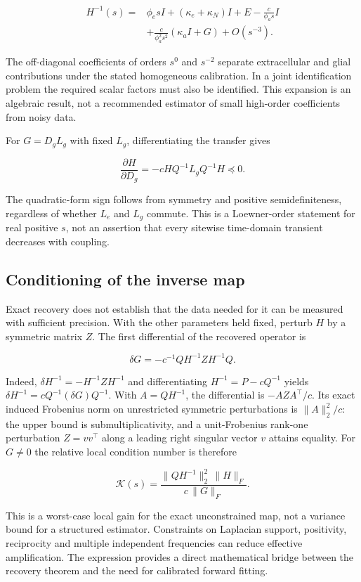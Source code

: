 \documentclass[
  11pt,
]{article}
\begin{document}
\[\begin{aligned}
H^{-1}(s)={}&\phi_e s I+(\kappa_e+\kappa_N)I+E-\frac{c}{\phi_a s}I\\
&+\frac{c}{\phi_a^2s^2}(\kappa_a I+G)+O(s^{-3}).
\end{aligned}\]

The off-diagonal coefficients of orders \(s^0\) and \(s^{-2}\) separate
extracellular and glial contributions under the stated homogeneous
calibration. In a joint identification problem the required scalar
factors must also be identified. This expansion is an algebraic result,
not a recommended estimator of small high-order coefficients from noisy
data.

For \(G=D_gL_g\) with fixed \(L_g\), differentiating the transfer gives

\[\frac{\partial H}{\partial D_g}=-cH Q^{-1}L_gQ^{-1}H\preceq0.\]

The quadratic-form sign follows from symmetry and positive
semidefiniteness, regardless of whether \(L_e\) and \(L_g\) commute.
This is a Loewner-order statement for real positive \(s\), not an
assertion that every sitewise time-domain transient decreases with
coupling.

\subsection{Conditioning of the inverse
map}\label{conditioning-of-the-inverse-map}

Exact recovery does not establish that the data needed for it can be
measured with sufficient precision. With the other parameters held
fixed, perturb \(H\) by a symmetric matrix \(Z\). The first differential
of the recovered operator is

\[\delta G=-c^{-1}QH^{-1}ZH^{-1}Q.\]

Indeed, \(\delta H^{-1}=-H^{-1}ZH^{-1}\) and differentiating
\(H^{-1}=P-cQ^{-1}\) yields \(\delta H^{-1}=cQ^{-1}(\delta G)Q^{-1}\).
With \(A=QH^{-1}\), the differential is \(-AZA^\top/c\). Its exact
induced Frobenius norm on unrestricted symmetric perturbations is
\(\|A\|_2^2/c\): the upper bound is submultiplicativity, and a
unit-Frobenius rank-one perturbation \(Z=vv^\top\) along a leading right
singular vector \(v\) attains equality. For \(G\ne0\) the relative local
condition number is therefore

\[\mathcal K(s)=\frac{\|QH^{-1}\|_2^2\,\|H\|_F}{c\,\|G\|_F}.\]

This is a worst-case local gain for the exact unconstrained map, not a
variance bound for a structured estimator. Constraints on Laplacian
support, positivity, reciprocity and multiple independent frequencies
can reduce effective amplification. The expression provides a direct
mathematical bridge between the recovery theorem and the need for
calibrated forward fitting.
\end{document}
